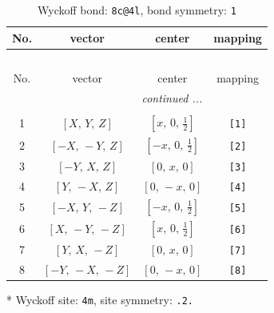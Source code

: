 \documentclass[fleqn,8pt]{jsarticle}
\begin{document}
\renewcommand{\arraystretch}{1.2}
\begin{longtable}{cccc}
\caption{Wyckoff bond: {\tt 8c@4l}, bond symmetry: {\tt 1}}
 \\
 \hline \hline
No. & vector & center & mapping \\ \hline \endfirsthead

\multicolumn{3}{l}{\tablename\ \thetable{}} \\
 \hline \hline
No. & vector & center & mapping \\ \hline \endhead

 \hline \hline
\multicolumn{3}{r}{\footnotesize\it continued ...} \\ \endfoot

 \hline \hline
\multicolumn{3}{r}{} \\ \endlastfoot

1 & $\left[ X,\, Y,\, Z \right]$ & $\left[ x,\, 0,\, \frac{1}{2} \right]$ & {\tt [1]} \\ \hline
2 & $\left[ - X,\, - Y,\, Z \right]$ & $\left[ - x,\, 0,\, \frac{1}{2} \right]$ & {\tt [2]} \\ \hline
3 & $\left[ - Y,\, X,\, Z \right]$ & $\left[ 0,\, x,\, 0 \right]$ & {\tt [3]} \\ \hline
4 & $\left[ Y,\, - X,\, Z \right]$ & $\left[ 0,\, - x,\, 0 \right]$ & {\tt [4]} \\ \hline
5 & $\left[ - X,\, Y,\, - Z \right]$ & $\left[ - x,\, 0,\, \frac{1}{2} \right]$ & {\tt [5]} \\ \hline
6 & $\left[ X,\, - Y,\, - Z \right]$ & $\left[ x,\, 0,\, \frac{1}{2} \right]$ & {\tt [6]} \\ \hline
7 & $\left[ Y,\, X,\, - Z \right]$ & $\left[ 0,\, x,\, 0 \right]$ & {\tt [7]} \\ \hline
8 & $\left[ - Y,\, - X,\, - Z \right]$ & $\left[ 0,\, - x,\, 0 \right]$ & {\tt [8]} \\
\end{longtable}
* Wyckoff site: {\tt 4m}, site symmetry: {\tt .2.}
\renewcommand{\arraystretch}{1.2}
\end{document}
